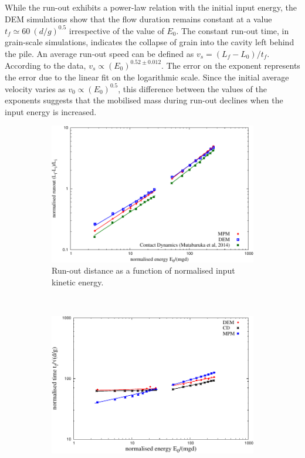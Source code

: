 \documentclass[3p,times,procedia,number]{elsarticle}
\begin{document}
While the run-out exhibits a power-law relation with the initial input energy, 
the DEM simulations show that the flow duration remains constant at a value  
$t_f \simeq 60 \  (d/g)^{0.5}$ irrespective of the value of $E_0$. The constant 
run-out time, in grain-scale simulations, indicates the collapse of grain into 
the cavity left behind the pile. An average run-out speed can be defined as 
$v_s = (L_f - L_0) / t_f$. According to the data, $v_s \propto 
(E_0)^{0.52\pm 0.012}$. The error on the exponent represents the 
error due to the linear fit on the logarithmic scale. Since the initial 
average velocity varies as $v_0 \propto (E_0)^{0.5}$, this difference between 
the values of the exponents suggests that the mobilised mass during run-out 
declines when the input energy is increased.


\begin{figure}[tbph]
  \centering
  \begin{subfigure}[b]{0.9\textwidth}
    \centering
    \includegraphics[width=\textwidth]{figs/Runout_Eo_MPM_CD_DEM}
    \caption{Run-out distance as a function of normalised input kinetic energy.}
    \label{fig:Runout_Eo_MPM_CD_DEM}
  \end{subfigure}
  \\
  \begin{subfigure}[b]{0.9\textwidth}
    \centering
    \includegraphics[width=\textwidth]{figs/Tf_vs_Eo_Slope}

\end{subfigure}
\end{figure}
\end{document}

